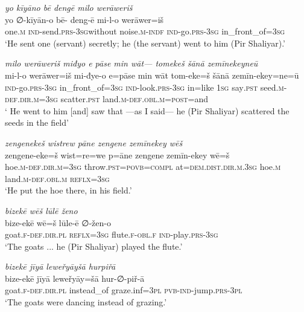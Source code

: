 \ea \label{ŽP.50}
\textit{yo kīyāno bē dengē milo werāweriš} \\ 
\gll yo ∅-kīyān-o bē- deng-ē mi-l-o werāwer=iš \\ 
 one\textsc{.m} \textsc{ind-}send\textsc{.prs}\textsc{-3sg}without noise\textsc{.m}\textsc{-indf} \textsc{ind-}go\textsc{.prs}\textsc{-3sg} in\_front\_of\textsc{=3sg} \\ 
\glt `He sent one (servant) secretly; he (the servant) went to him (Pir Shaliyar).'
\z 
 
\ea \label{ŽP.51}
\textit{milo werāweriš miđyo e pāse min wāt— tomekeš šānā zemīnekeyneū} \\ 
\gll mi-l-o werāwer=iš mi-đye-o e=pāse min wāt tom-eke=š šānā zemīn-ekey=ne=ū \\ 
 \textsc{ind-}go\textsc{.prs}\textsc{-3sg} in\_front\_of\textsc{=3sg} \textsc{ind-}look\textsc{.prs}\textsc{-3sg} in=like \textsc{1sg} say\textsc{.pst} seed\textsc{.m}\textsc{-def}\textsc{.dir}\textsc{.m}\textsc{=3sg} scatter\textsc{.pst} land\textsc{.m}\textsc{-def}\textsc{.obl}\textsc{.m}\textsc{=\textsc{post}}=and \\ 
\glt ` He went to him [and] saw that —as I said— he (Pir Shaliyar) scattered the seeds in the field'
\z 
 
\ea \label{ŽP.52}
\textit{zengenekeš wistrew pāne zengene zemīnekey wēš} \\ 
\gll zengene-eke=š wist=re=we p=āne zengene zemīn-ekey wē=š \\ 
 hoe\textsc{.m}\textsc{-def}\textsc{.dir}\textsc{.m}\textsc{=3sg} throw\textsc{.pst}\textsc{=\textsc{povb}}\textsc{=compl} at=\textsc{dem.dist}\textsc{.dir}\textsc{.m}\textsc{.3sg} hoe\textsc{.m} land\textsc{.m}\textsc{-def}\textsc{.obl}\textsc{.m} \textsc{reflx}\textsc{=3sg} \\ 
\glt `He put the hoe there, in his field.'
\z 
 
\ea \label{ŽP.54}
\textit{bizekē wēš lūlē ženo} \\ 
\gll bize-ekē wē=š lūle-ē ∅-žen-o \\ 
 goat\textsc{.f}\textsc{-def}\textsc{.dir}\textsc{.pl} \textsc{reflx}\textsc{=3sg} flute\textsc{.f}\textsc{-obl}\textsc{.f} \textsc{ind-}play\textsc{.prs}\textsc{-3sg} \\ 
\glt `The goats ... he (Pir Shaliyar) played the flute.'
\z 
 
\ea \label{ŽP.55}
\textit{bizekē jīyā leweřyāyšā hurpiřā} \\ 
\gll bize-ekē jīyā leweřyāy=šā hur-∅-piř-ā \\ 
 goat\textsc{.f}\textsc{-def}\textsc{.dir}\textsc{.pl} instead\_of graze.inf\textsc{=3pl} \textsc{pvb-}\textsc{ind-}jump\textsc{.prs}\textsc{-3pl} \\ 
\glt `The goats were dancing instead of grazing.'
\z 
 
